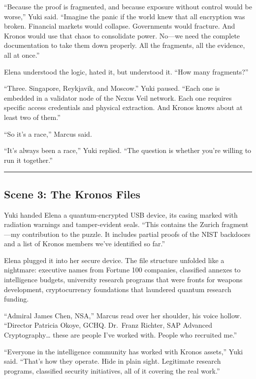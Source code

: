 \documentclass[12pt,letterpaper]{book}
\begin{document}
``Because the proof is fragmented, and because exposure without control would be worse,'' Yuki said. ``Imagine the panic if the world knew that all encryption was broken. Financial markets would collapse. Governments would fracture. And Kronos would use that chaos to consolidate power. No---we need the complete documentation to take them down properly. All the fragments, all the evidence, all at once.''

Elena understood the logic, hated it, but understood it. ``How many fragments?''

``Three. Singapore, Reykjavik, and Moscow.'' Yuki paused. ``Each one is embedded in a validator node of the Nexus Veil network. Each one requires specific access credentials and physical extraction. And Kronos knows about at least two of them.''

``So it's a race,'' Marcus said.

``It's always been a race,'' Yuki replied. ``The question is whether you're willing to run it together.''

\begin{center}\rule{0.5\linewidth}{0.5pt}\end{center}

\hypertarget{scene-3-the-kronos-files}{%
\subsection{Scene 3: The Kronos Files}\label{scene-3-the-kronos-files}}

Yuki handed Elena a quantum-encrypted USB device, its casing marked with radiation warnings and tamper-evident seals. ``This contains the Zurich fragment---my contribution to the puzzle. It includes partial proofs of the NIST backdoors and a list of Kronos members we've identified so far.''

Elena plugged it into her secure device. The file structure unfolded like a nightmare: executive names from Fortune 100 companies, classified annexes to intelligence budgets, university research programs that were fronts for weapons development, cryptocurrency foundations that laundered quantum research funding.

``Admiral James Chen, NSA,'' Marcus read over her shoulder, his voice hollow. ``Director Patricia Okoye, GCHQ. Dr.~Franz Richter, SAP Advanced Cryptography\ldots{} these are people I've worked with. People who recruited me.''

``Everyone in the intelligence community has worked with Kronos assets,'' Yuki said. ``That's how they operate. Hide in plain sight. Legitimate research programs, classified security initiatives, all of it covering the real work.''
\end{document}
